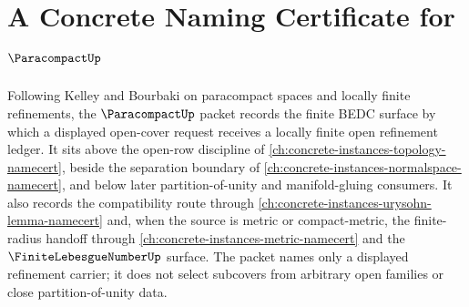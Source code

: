 \chapter{A Concrete Naming Certificate for $\ParacompactUp$}
\label{ch:concrete-instances-paracompact-namecert}

Following Kelley and Bourbaki on paracompact spaces and locally finite refinements, the $\ParacompactUp$ packet records the finite BEDC surface by which a displayed open-cover request receives a locally finite open refinement ledger. It sits above the open-row discipline of \autoref{ch:concrete-instances-topology-namecert}, beside the separation boundary of \autoref{ch:concrete-instances-normalspace-namecert}, and below later partition-of-unity and manifold-gluing consumers. It also records the compatibility route through \autoref{ch:concrete-instances-urysohn-lemma-namecert} and, when the source is metric or compact-metric, the finite-radius handoff through \autoref{ch:concrete-instances-metric-namecert} and the $\FiniteLebesgueNumberUp$ surface. The packet names only a displayed refinement carrier; it does not select subcovers from arbitrary open families or close partition-of-unity data.

